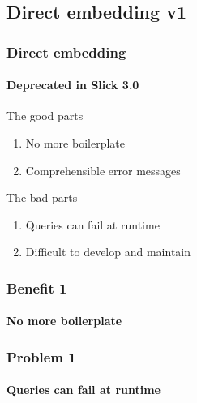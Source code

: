 \documentclass[xcolor=dvipsnames]{beamer}
\theoremstyle{definition}
\begin{document}

\subsection{Direct embedding v1} %
\label{sub:Directembeddingv1}

\begin{frame}[fragile]
    \frametitle{Direct embedding}
    \framesubtitle{Deprecated in Slick 3.0}
    \begin{block}{The good parts}
        \begin{enumerate}
            \item No more boilerplate
            \item Comprehensible error messages
        \end{enumerate}
    \end{block}
    \begin{block}{The bad parts}
        \begin{enumerate}
            \item Queries can fail at runtime
            \item Difficult to develop and maintain
        \end{enumerate}
    \end{block}
\end{frame}

\begin{frame}[fragile]
    \frametitle{Benefit 1}
    \framesubtitle{No more boilerplate}
    \begin{block}{}
        
    \end{block}
\end{frame}

\begin{frame}[fragile]
    \frametitle{Problem 1}
    \framesubtitle{Queries can fail at runtime}
    \begin{block}{}
        
    \end{block}
\end{frame}

\end{document}

